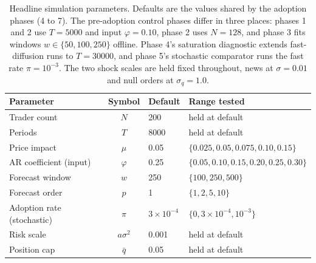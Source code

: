 \documentclass[12pt]{article}
\begin{document}
\begin{table}[h]
\centering
\caption{Headline simulation parameters. Defaults are the values shared by the adoption phases (4 to 7). The pre-adoption control phases differ in three places: phases 1 and 2 use $T = 5000$ and input $\varphi = 0.10$, phase 2 uses $N = 128$, and phase 3 fits windows $w \in \{50, 100, 250\}$ offline. Phase 4's saturation diagnostic extends fast-diffusion runs to $T = 30000$, and phase 5's stochastic comparator runs the fast rate $\pi = 10^{-3}$. The two shock scales are held fixed throughout, news at $\sigma = 0.01$ and null orders at $\sigma_q = 1.0$.} %
\label{tab:parameters}
\begin{tabular}{@{}l c l l@{}}
\toprule
Parameter & Symbol & Default & Range tested \\
\midrule
Trader count & $N$ & 200 & held at default \\ %
Periods & $T$ & 8000 & held at default \\ %
Price impact & $\mu$ & 0.05 & $\{0.025, 0.05, 0.075, 0.10, 0.15\}$ \\ %
AR coefficient (input) & $\varphi$ & 0.25 & $\{0.05, 0.10, 0.15, 0.20, 0.25, 0.30\}$ \\ %
Forecast window & $w$ & 250 & $\{100, 250, 500\}$ \\ %
Forecast order & $p$ & 1 & $\{1, 2, 5, 10\}$ \\ %
Adoption rate (stochastic) & $\pi$ & $3 \times 10^{-4}$ & $\{0, 3 \times 10^{-4}, 10^{-3}\}$ \\ %
Risk scale & $a\sigma^{2}$ & 0.001 & held at default \\ %
Position cap & $\bar{q}$ & 0.05 & held at default \\ %
\bottomrule
\end{tabular}
\end{table}
\end{document}
